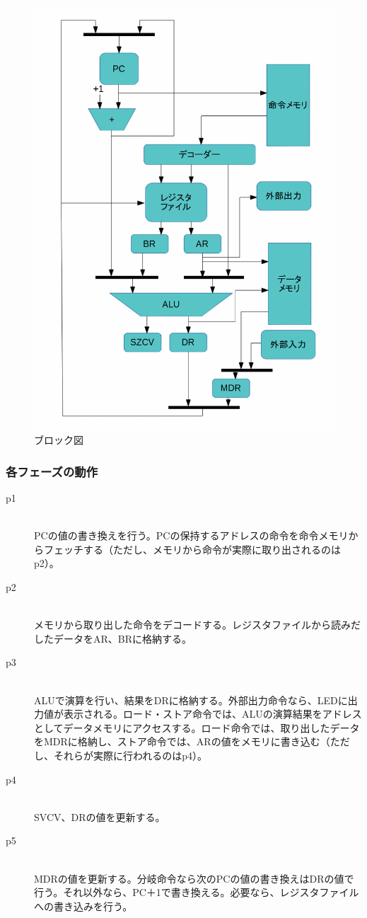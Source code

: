 \documentclass[titlepage]{jsarticle}
\begin{document}
\begin{figure}[h]
\centering
\includegraphics[width=120mm]{figures/data_flow.png}
\caption{ブロック図}
\label{fig:block}
\end{figure}

\subsubsection{各フェーズの動作}

\begin{description}
\item[p1] \mbox{} \\
PCの値の書き換えを行う。PCの保持するアドレスの命令を命令メモリからフェッチする（ただし、メモリから命令が実際に取り出されるのはp2）。
\item[p2] \mbox{} \\
メモリから取り出した命令をデコードする。レジスタファイルから読みだしたデータをAR、BRに格納する。
\item[p3] \mbox{} \\
ALUで演算を行い、結果をDRに格納する。外部出力命令なら、LEDに出力値が表示される。ロード・ストア命令では、ALUの演算結果をアドレスとしてデータメモリにアクセスする。ロード命令では、取り出したデータをMDRに格納し、ストア命令では、ARの値をメモリに書き込む（ただし、それらが実際に行われるのはp4）。
\item[p4] \mbox{} \\
SVCV、DRの値を更新する。
\item[p5] \mbox{} \\
MDRの値を更新する。分岐命令なら次のPCの値の書き換えはDRの値で行う。それ以外なら、PC＋1で書き換える。必要なら、レジスタファイルへの書き込みを行う。
\end{description}
\end{document}
